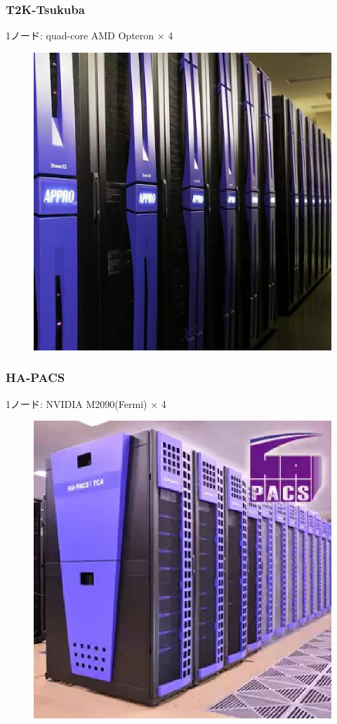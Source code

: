 \documentclass[dvipdfmx,20pt,notheorems,t]{beamer}
\begin{document}
\begin{frame}\frametitle{T2K-Tsukuba}
\small
1ノード: quad-core AMD Opteron $\times$ 4
\begin{figure}[htb]
\centering
\includegraphics[height=0.6\textheight]{t2kt.eps}
\end{figure}
\end{frame}

\begin{frame}\frametitle{HA-PACS}
\small
1ノード: NVIDIA M2090(Fermi) $\times$ 4
\begin{figure}[htb]
\centering
\includegraphics[height=0.6\textheight]{hapacs.eps}
\end{figure}
\end{frame}
\end{document}
